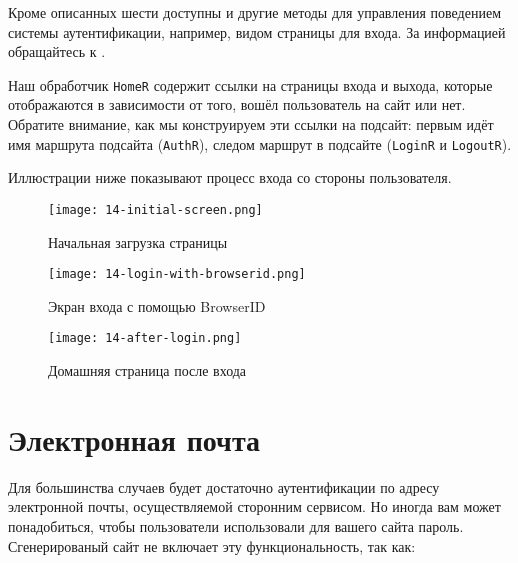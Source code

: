 Кроме описанных шести доступны и другие методы для управления поведением
системы аутентификации, например, видом страницы для входа. За информацией
обращайтесь к
.

Наш обработчик \lstinline'HomeR' содержит ссылки на страницы входа и выхода,
которые отображаются в зависимости от того, вошёл пользователь на сайт или нет.
Обратите внимание, как мы конструируем эти ссылки на подсайт: первым идёт имя
маршрута подсайта (\lstinline'AuthR'), следом маршрут в подсайте
(\lstinline'LoginR' и \lstinline'LogoutR').

Иллюстрации ниже показывают процесс входа со стороны пользователя.

\begin{figure}[h!]
  \centering
  \texttt{[image: 14-initial-screen.png]}
  \caption{Начальная загрузка страницы}
\end{figure}

\begin{figure}[h!]
  \centering
  \texttt{[image: 14-login-with-browserid.png]}
  \caption{Экран входа с помощью BrowserID}
\end{figure}

\begin{figure}[h!]
  \centering
  \texttt{[image: 14-after-login.png]}
  \caption{Домашняя страница после входа}
\end{figure}

\section{Электронная почта}

Для большинства случаев будет достаточно аутентификации по адресу электронной
почты, осуществляемой сторонним сервисом. Но иногда вам может понадобиться,
чтобы пользователи использовали для вашего сайта пароль. Сгенерированый сайт не
включает эту функциональность, так как:

